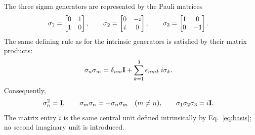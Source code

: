 The three sigma generators are represented by the Pauli matrices
\begin{equation}
\mathbf{\sigma}_1=
\begin{bmatrix}
0&1\\
1&0
\end{bmatrix},
\qquad
\mathbf{\sigma}_2=
\begin{bmatrix}
0&-i\\
i&0
\end{bmatrix},
\qquad
\mathbf{\sigma}_3=
\begin{bmatrix}
1&0\\
0&-1
\end{bmatrix}.
\label{eq:pauli-matrices}
\end{equation}
The same defining rule as for the intrinsic generators is satisfied by
their matrix products:
\begin{equation}
\mathbf{\sigma}_n\mathbf{\sigma}_m
=\delta_{nm}\mathbf{I}
+\sum_{k=1}^{3}\epsilon_{nmk}\,i\mathbf{\sigma}_k.
\label{eq:pauli-matrix-product}
\end{equation}
Consequently,
\begin{equation}
\mathbf{\sigma}_n^2=\mathbf{I},
\qquad
\mathbf{\sigma}_m\mathbf{\sigma}_n
=-\mathbf{\sigma}_n\mathbf{\sigma}_m
\quad(m\neq n),
\qquad
\mathbf{\sigma}_1\mathbf{\sigma}_2\mathbf{\sigma}_3=i\mathbf{I}.
\label{eq:pauli-matrix-basis-products}
\end{equation}
The matrix entry \(i\) is the same central unit defined intrinsically by
Eq.\ \eqref{eq:basis}; no second imaginary unit is introduced.

